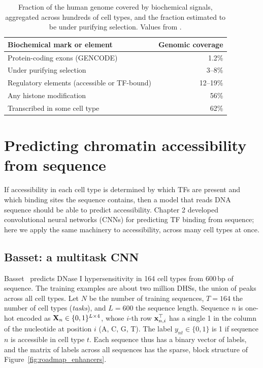 \begin{table}[t]
  \centering
  \caption{Fraction of the human genome covered by biochemical signals, aggregated across hundreds of cell types, and the fraction estimated to be under purifying selection. Values from \citet{kellis2014}.}
  \label{tab:functional}
  \begin{tabular}{lr}
    \toprule
    Biochemical mark or element & Genomic coverage \\
    \midrule
    Protein-coding exons (GENCODE) & 1.2\% \\
    Under purifying selection & 3--8\% \\
    Regulatory elements (accessible or TF-bound) & 12--19\% \\
    Any histone modification & 56\% \\
    Transcribed in some cell type & 62\% \\
    \bottomrule
  \end{tabular}
\end{table}

\section{Predicting chromatin accessibility from sequence}
\label{sec:basset}

If accessibility in each cell type is determined by which TFs are present and which binding sites the sequence contains, then a model that reads DNA sequence should be able to predict accessibility. Chapter 2 developed convolutional neural networks (CNNs) for predicting TF binding from sequence; here we apply the same machinery to accessibility, across many cell types at once.

\subsection{Basset: a multitask CNN}

Basset~\citep{kelley2016} predicts DNase I hypersensitivity in 164 cell types from 600\,bp of sequence. The training examples are about two million DHSs, the union of peaks across all cell types. Let $N$ be the number of training sequences, $T=164$ the number of cell types (\emph{tasks}), and $L=600$ the sequence length. Sequence $n$ is one-hot encoded as $\mathbf{X}_n\in\{0,1\}^{L\times 4}$, whose $i$-th row $\mathbf{x}_{n,i}^\top$ has a single 1 in the column of the nucleotide at position $i$ (A, C, G, T). The label $y_{nt}\in\{0,1\}$ is 1 if sequence $n$ is accessible in cell type $t$. Each sequence thus has a binary vector of labels, and the matrix of labels across all sequences has the sparse, block structure of Figure~\ref{fig:roadmap_enhancers}.

